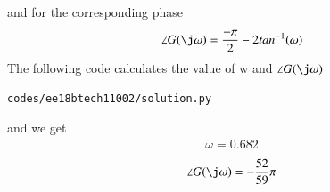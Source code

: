 \begin{enumerate}[label=\thesection.\arabic*.,ref=\thesection.\theenumi]
and for the corresponding phase
\begin{align}
\angle G(\j\omega) = \frac{-\pi}{2} - 2tan^{-1}(\omega)
\end{align}
The following code calculates the value of w and $\angle G(\j\omega)$
\begin{lstlisting}
codes/ee18btech11002/solution.py
\end{lstlisting}
%
and we get 
\begin{align}
\omega = 0.682
\end{align}
\begin{align}
\angle G(\j\omega)=-\frac{52}{59}\pi
\end{align}
\end{enumerate}
